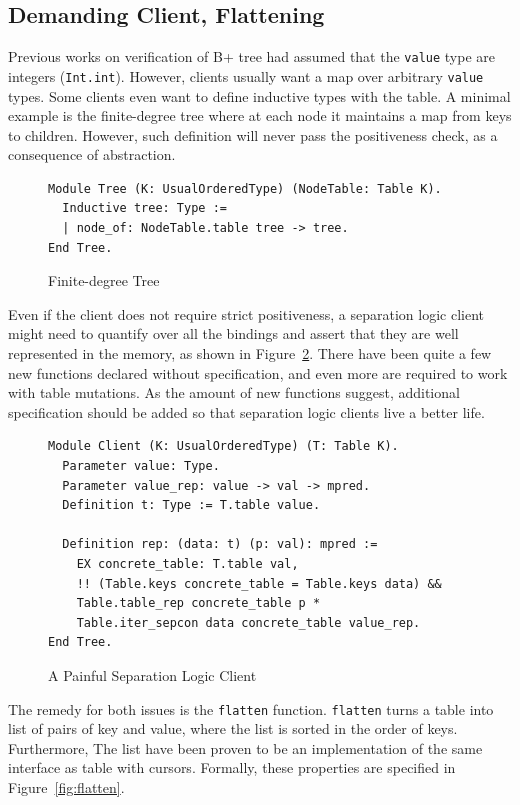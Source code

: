 \documentclass[runningheads]{llncs}
\begin{document}
\subsection{Demanding Client, Flattening}

Previous works on verification of B+ tree had assumed that the \texttt{value}
type are integers (\texttt{Int.int}). However, clients usually want a map over
arbitrary \texttt{value} types. Some clients even want to define inductive types
with the table. A minimal example is the finite-degree tree where at each node
it maintains a map from keys to children. However, such definition will never
pass the positiveness check, as a consequence of abstraction.

\begin{figure}[htbp]
  \centering
\begin{verbatim}
Module Tree (K: UsualOrderedType) (NodeTable: Table K).
  Inductive tree: Type :=
  | node_of: NodeTable.table tree -> tree.
End Tree.
\end{verbatim}
  \caption{Finite-degree Tree}\label{fig:inductive}
\end{figure}

Even if the client does not require strict positiveness, a separation logic
client might need to quantify over all the bindings and assert that they are
well represented in the memory, as shown in Figure~\ref{fig:rep}. There have
been quite a few new functions declared without specification, and even more are
required to work with table mutations. As the amount of new functions suggest,
additional specification should be added so that separation logic clients live a
better life. 

\begin{figure}[htbp]
  \centering
\begin{verbatim}
Module Client (K: UsualOrderedType) (T: Table K).
  Parameter value: Type.
  Parameter value_rep: value -> val -> mpred.
  Definition t: Type := T.table value.

  Definition rep: (data: t) (p: val): mpred :=
    EX concrete_table: T.table val,
    !! (Table.keys concrete_table = Table.keys data) &&
    Table.table_rep concrete_table p *
    Table.iter_sepcon data concrete_table value_rep.
End Tree.
\end{verbatim}
  \caption{A Painful Separation Logic Client}\label{fig:rep}
\end{figure}

The remedy for both issues is the \texttt{flatten} function. \texttt{flatten}
turns a table into list of pairs of key and value, where the list is sorted in
the order of keys. Furthermore, The list have been proven to be an
implementation of the same interface as table with cursors. Formally, these
properties are specified in Figure~\ref{fig:flatten}.
\end{document}
